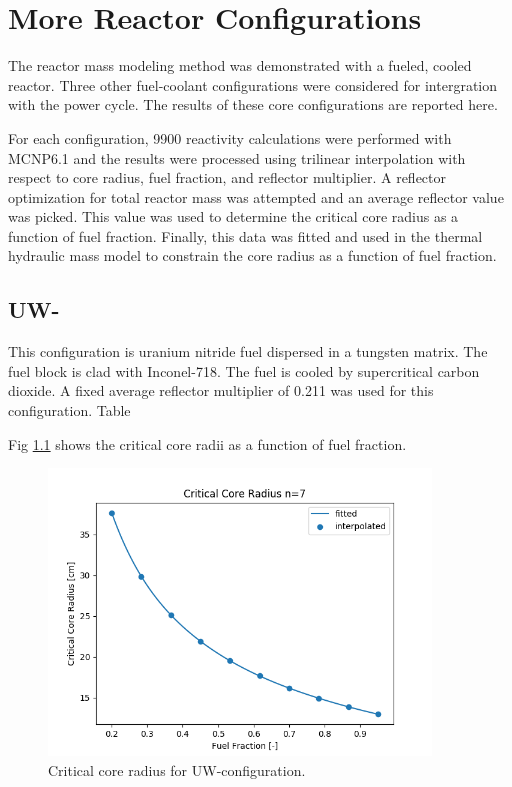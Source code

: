 \chapter{More Reactor Configurations}\label{ch:appendix-a}

The reactor mass modeling method was demonstrated with a \uox fueled, \codiox
cooled reactor. Three other fuel-coolant configurations were considered for
intergration with the power cycle. The results of these core configurations are
reported here.

For each configuration, 9900 reactivity calculations were performed with
MCNP6.1 and the \keff results were processed using trilinear interpolation with
respect to core radius, fuel fraction, and reflector multiplier. A reflector
optimization for total reactor mass was attempted and an average reflector value
was picked. This value was used to determine the critical core radius as a
function of fuel fraction. Finally, this data was fitted and used in the thermal
hydraulic mass model to constrain the core radius as a function of fuel
fraction.

\section{UW-\codiox}
This configuration is uranium nitride fuel dispersed in a tungsten matrix. The
fuel block is clad with Inconel-718. The
fuel is cooled by supercritical carbon dioxide. A fixed average reflector
multiplier of 0.211 was used for this configuration. Table 



Fig \ref{fig:core_r_un_co2}
shows the critical core radii as a function of fuel fraction.

\begin{figure}[h]
    \centering
    \includegraphics[width=4in]{../images/core_r_un_co2.png}
\caption{Critical core radius for UW-\codiox configuration.}
\label{fig:core_r_un_co2}
\end{figure}

